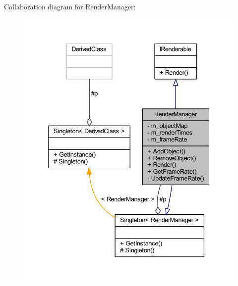 Collaboration diagram for Render\+Manager\+:\nopagebreak
\begin{figure}[H]
\begin{center}
\leavevmode
\includegraphics[width=338pt]{class_render_manager__coll__graph}
\end{center}
\end{figure}
